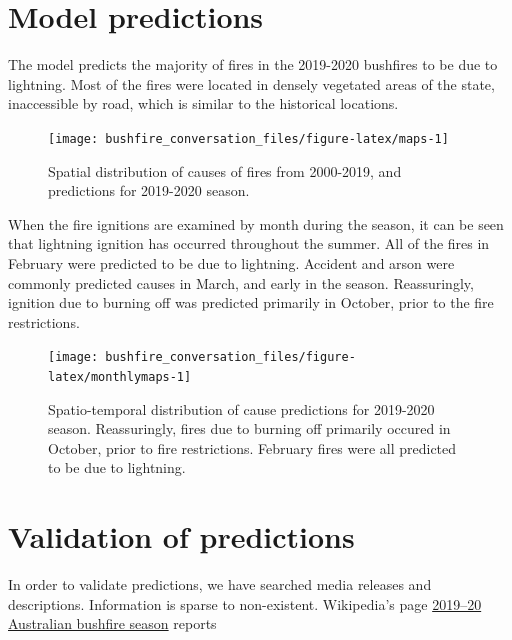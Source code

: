 \documentclass[
  11pt,
  a4paper,
]{article}
\begin{document}
\hypertarget{models}{%
\section{Model predictions}\label{models}}

The model predicts the majority of fires in the 2019-2020 bushfires to be due to lightning. Most of the fires were located in densely vegetated areas of the state, inaccessible by road, which is similar to the historical locations.

\begin{figure}[H]

{\centering \texttt{[image: bushfire\_conversation\_files/figure-latex/maps-1]} 

}

\caption{Spatial distribution of causes of fires from 2000-2019, and predictions for 2019-2020 season.}\label{fig:maps}
\end{figure}

When the fire ignitions are examined by month during the season, it can be seen that lightning ignition has occurred throughout the summer. All of the fires in February were predicted to be due to lightning. Accident and arson were commonly predicted causes in March, and early in the season. Reassuringly, ignition due to burning off was predicted primarily in October, prior to the fire restrictions.

\begin{figure}[H]

{\centering \texttt{[image: bushfire\_conversation\_files/figure-latex/monthlymaps-1]} 

}

\caption{Spatio-temporal distribution of cause predictions for 2019-2020 season. Reassuringly, fires due to burning off primarily occured in October, prior to fire restrictions. February fires were all predicted to be due to lightning.}\label{fig:monthlymaps}
\end{figure}

\hypertarget{validation-of-predictions}{%
\section*{Validation of predictions}\label{validation-of-predictions}}

In order to validate predictions, we have searched media releases and descriptions. Information is sparse to non-existent. Wikipedia's page \href{https://en.wikipedia.org/wiki/2019-20_Australian_bushfire_season}{2019--20 Australian bushfire season} reports
\end{document}
